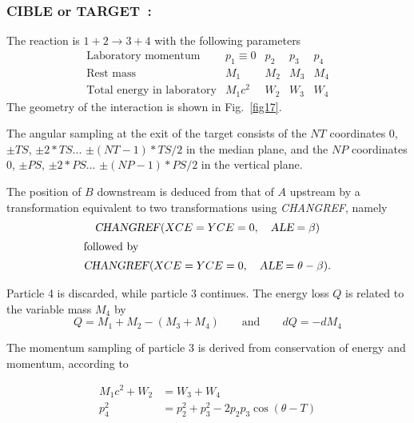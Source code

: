 \vfill




\newpage

\subsubsection*{CIBLE or TARGET~: \CIBLETitl}
\label{CIBLE}\label{TARGET}
 
\medskip

 The reaction is $ 1+2 \longrightarrow  3+4 $ with the following parameters 
$$
\begin{array}{lllll}
	\text{Laboratory momentum} & p_1\equiv  0 &  p_2 &   p_3 &    p_4 \\
	\text{Rest mass}           &   M_1        &   M_2 & M_3 &    M_4 \\ 
	\text{Total energy in laboratory} & M_1c^2 &  W_2 &    W_3 &   W_4 
\end{array}
$$
%
 The geometry of the interaction is shown in Fig.~\ref{fig17}.   
\medskip

\noindent The angular  sampling at the exit of the target consists of the $ NT$ 
coordinates 0,  $ \pm TS$,  $ \pm 2\ast TS$...   $\pm (NT-1)\ast TS/2 $ 
in the median plane, 
and the $ NP $ coordinates 0, $ \pm PS$,  $ \pm 2\ast PS$... $ \pm (NP-1)\ast PS/2$ 
in the vertical plane.  
\medskip

\noindent The position of $ B $ downstream is deduced from that of $ A $
upstream  by a transformation equivalent to two transformations using \textsl{CHANGREF},
 namely
 \begin{gather*}
	 \text{\textsl{CHANGREF}}(XCE=YCE=0,\quad  \textsl{ALE}=\beta )  \\
\intertext{followed by} 
	 \text{\textsl{CHANGREF}}(XCE=YCE=0,\quad \textsl{ALE}=\theta -\beta ). 
 \end{gather*}

 
\noindent Particle  4 is discarded, while particle 3 continues. The energy
loss $ Q $ is related to the variable mass $ M_4 $ by
$$ Q=M_1+M_2-(M_3+M_4)\qquad \text{and} \qquad dQ=-dM_4 $$

\noindent The momentum sampling of particle 3 is derived from conservation of
energy and 
momentum, according to 

\begin{align*}
	M_1c^2+W_2 & =  W_3+W_4  \\
	p^2_4 & =  p^2_2 +p^2_3 -2p_2p_3 \cos (\theta -T) 
\end{align*}



